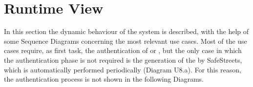 \documentclass[../../DD.tex]{subfiles}
\begin{document}
\section{Runtime View\label{sect:2.4}}

In this section the dynamic behaviour of the system is described, with the help of some Sequence Diagrams concerning the most relevant use cases.
Most of the use cases require, as first task, the authentication of  or , but the only case in which the authentication phase is not required is the generation of the  by SafeStreets, which is automatically performed periodically (Diagram U8.a). For this reason, the authentication process is not shown in the following Diagrams.


\newpage
\end{document}
